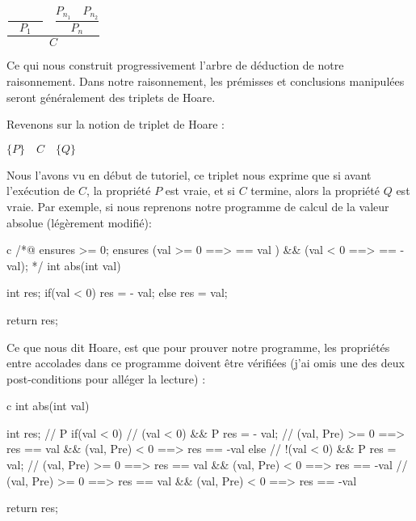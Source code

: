 \documentclass[middle]{zmdocument}
\begin{document}
\begin{center}
$\dfrac{\dfrac{}{\quad P_1\quad} \quad \dfrac{P_{n_1}\quad P_{n_2}}{P_n}}{C}$


\end{center}


Ce qui nous construit progressivement l'arbre de déduction de notre raisonnement.
Dans notre raisonnement, les prémisses et conclusions manipulées seront 
généralement des triplets de Hoare.





Revenons sur la notion de triplet de Hoare :




\begin{center}
$\{ P \}\quad  C\quad \{ Q \}$


\end{center}


Nous l'avons vu en début de tutoriel, ce triplet nous exprime que si avant 
l'exécution de $C$, la propriété $P$ est vraie, et si $C$ termine, alors la
propriété $Q$ est vraie. Par exemple, si nous reprenons notre programme de
calcul de la valeur absolue (légèrement modifié):



\begin{CodeBlock}{c}
/*@
  ensures \result >= 0;
  ensures (val >= 0 ==> \result == val ) && (val <  0 ==> \result == -val);
*/
int abs(int val){
  int res;
  if(val < 0) res = - val;
  else        res = val;

  return res;
}
\end{CodeBlock}



Ce que nous dit Hoare, est que pour prouver notre programme, les propriétés
entre accolades dans ce programme doivent être vérifiées (j'ai omis une des
deux post-conditions pour alléger la lecture) :



\begin{CodeBlock}{c}
int abs(int val){
  int res;
// { P }
  if(val < 0){
// {  (val < 0) && P }
    res = - val;
// { \at(val, Pre) >= 0 ==> res == val && \at(val, Pre) < 0 ==> res == -val }
  } else {
// { !(val < 0) && P }
    res = val;
// { \at(val, Pre) >= 0 ==> res == val && \at(val, Pre) < 0 ==> res == -val }
  }
// { \at(val, Pre) >= 0 ==> res == val && \at(val, Pre) < 0 ==> res == -val }

  return res;
}
\end{CodeBlock}
\end{document}
